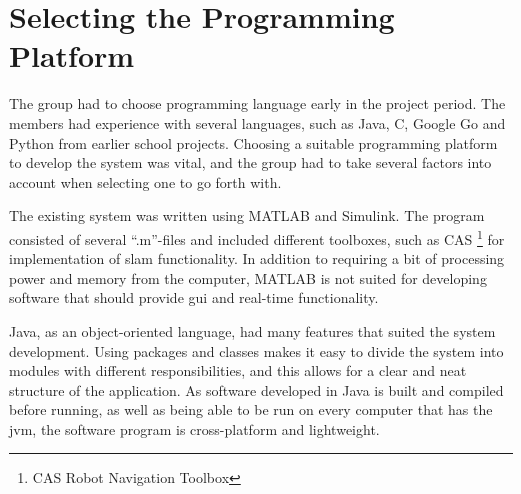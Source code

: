 \section{Selecting the Programming Platform}
The group had to choose programming language early in the project period. The members had experience with several languages, such as Java, C, Google Go and Python from earlier school projects. Choosing a suitable programming platform to develop the system was vital, and the group had to take several factors into account when selecting one to go forth with.

The existing system was written using MATLAB and Simulink. The program consisted of several ``.m''-files and included different toolboxes,  such as CAS \footnote{CAS Robot Navigation Toolbox} for implementation of \acrshort{slam} functionality. In addition to requiring a bit of processing power and memory from the computer, MATLAB is not suited for developing software that should provide \acrshort{gui} and real-time functionality.

Java, as an object-oriented language, had many features that suited the system development. Using packages and classes makes it easy to divide the system into modules with different responsibilities, and this allows for a clear and neat structure of the application. As software developed in Java is built and compiled before running, as well as being able to be run on every computer that has the \acrfull{jvm}, the software program is cross-platform and lightweight.